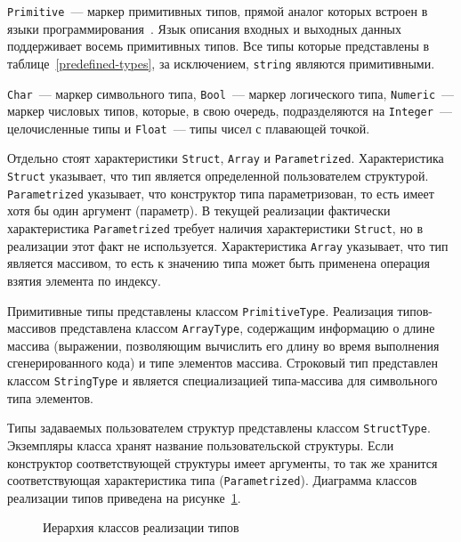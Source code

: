 \documentclass[times,specification,annotation]{style/itmo-student-thesis/itmo-student-thesis}
\begin{document}
\texttt{Primitive}~--- маркер примитивных типов, прямой аналог которых встроен в языки программирования~\cite{stone1987program}. Язык описания входных и выходных данных поддерживает восемь примитивных типов. Все типы которые представлены в таблице~\ref{predefined-types}, за исключением, \texttt{string} являются примитивными.

\texttt{Char}~--- маркер символьного типа, \texttt{Bool}~--- маркер логического типа, \texttt{Numeric}~--- маркер числовых типов, которые, в свою очередь, подразделяются на \texttt{Integer}~--- целочисленные типы и \texttt{Float}~--- типы чисел с плавающей точкой. 

Отдельно стоят характеристики \texttt{Struct}, \texttt{Array} и \texttt{Parametrized}. Характеристика \texttt{Struct} указывает, что тип является определенной пользователем структурой. \texttt{Parametrized} указывает, что конструктор типа параметризован, то есть имеет хотя бы один аргумент (параметр). В текущей реализации фактически характеристика \texttt{Parametrized} требует наличия характеристики \texttt{Struct}, но в реализации этот факт не используется. Характеристика \texttt{Array} указывает, что тип является массивом, то есть к значению типа может быть применена операция взятия элемента по индексу.

Примитивные типы представлены классом \texttt{PrimitiveType}. Реализация типов-массивов представлена классом \texttt{ArrayType}, содержащим информацию о длине массива (выражении, позволяющим вычислить его длину во время выполнения сгенерированного кода) и типе элементов массива. Строковый тип представлен классом \texttt{StringType} и является специализацией типа-массива для символьного типа элементов.

Типы задаваемых пользователем структур представлены классом \texttt{StructType}. Экземпляры класса хранят название пользовательской структуры. Если конструктор соответствующей структуры имеет аргументы, то так же хранится соответствующая характеристика типа (\texttt{Parametrized}). Диаграмма классов реализации типов приведена на рисунке~\ref{type-classes-hierarchy}.

\begin{figure}[!h]
\caption{Иерархия классов реализации типов}\label{type-classes-hierarchy}
\centering
{}
\end{figure}
\end{document}
